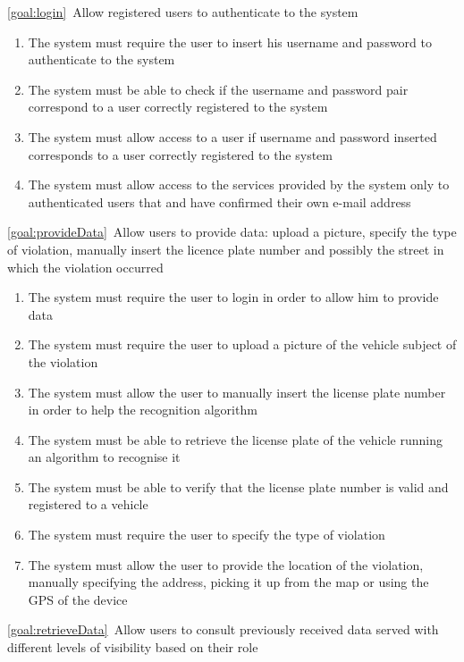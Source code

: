 \begin{description}
  			
		\item \ref{goal:login}\ Allow registered users to authenticate to the system
			\begin{enumerate}[label=\textbf{R\arabic*}, resume]
  				\item The system must require the user to insert his username and password to authenticate to the system
   				\item The system must be able to check if the username and password pair
   				correspond to a user correctly registered to the system
   				\item The system must allow access to a user if username and password inserted corresponds to a user correctly registered to the system
   				\item The system must allow access to the services provided by the system only to authenticated users that and have confirmed their own e-mail address
			\end{enumerate}
		\item \ref{goal:provideData}\ Allow users to provide data: upload a picture, specify the type of violation, manually insert the licence plate number and possibly the street in which the violation occurred
			\begin{enumerate}[resume*]
				\item The system must require the user to login in order to allow him to provide data
				\item The system must require the user to upload a picture of the vehicle subject of the violation
  				\item The system must allow the user to manually insert the license plate number in order to help the recognition algorithm
  				\item The system must be able to retrieve the license plate of the vehicle running an algorithm to recognise it
  				\item The system must be able to verify that the license plate number is valid and registered to a vehicle
  				\item The system must require the user to specify the type of violation
  				\item The system must allow the user to provide the location of the violation, manually specifying the address, picking it up from the map or using the GPS of the device
   			\end{enumerate}
		\item \ref{goal:retrieveData}\ Allow users to consult previously received data served with different levels of visibility based on their role

\end{description}
